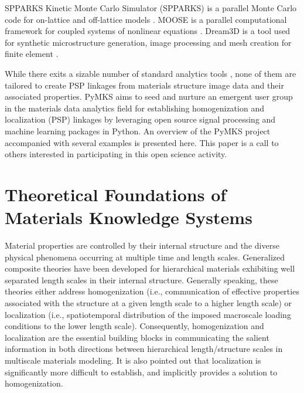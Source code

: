 \documentclass{bmcart}
\begin{document}
SPPARKS Kinetic Monte Carlo Simulator (SPPARKS) is a parallel Monte Carlo code for on-lattice and off-lattice models \cite{plimpton2012spparks}. MOOSE is a parallel computational framework for coupled systems of nonlinear equations \cite{gaston2009moose}. Dream3D is a tool used for synthetic microstructure generation, image processing and mesh creation for finite element \cite{groeber2014dream}.

While there exits a sizable number of standard analytics tools
\cite{littell2006sas, seabold2010statsmodels, pedregosa2011scikit,
  albanese2012mlpy, goodfellow2013pylearn2, mckinney2012python,
  muller2014pystruct, demvsar2004orange, abadi2016tensorflow,
  van2014scikit}, none of them are tailored to create PSP linkages
from materials structure image data and their associated
properties. PyMKS aims to seed and nurture an emergent user group in
the materials data analytics field for establishing homogenization and
localization (PSP) linkages by leveraging open source signal
processing and machine learning packages in Python. An overview of the
PyMKS project accompanied with several examples is presented
here. This paper is a call to others interested in participating in
this open science activity.

\section{Theoretical Foundations of Materials Knowledge Systems}

Material properties are controlled by their internal structure and the diverse physical phenomena occurring at multiple time and length scales. Generalized composite theories \cite{hill1963elastic, hashin1983analysis} have been developed for hierarchical materials exhibiting well separated length scales in their internal structure. Generally speaking, these theories either address homogenization (i.e., communication of effective properties associated with the structure at a given length scale to a higher length scale) or localization (i.e., spatiotemporal distribution of the imposed macroscale loading conditions to the lower length scale). Consequently, homogenization and localization are the essential building blocks in communicating the salient information in both directions between hierarchical length/structure scales in multiscale materials modeling. It is also pointed out that localization is significantly more difficult to establish, and implicitly provides a solution to homogenization.
\end{document}
